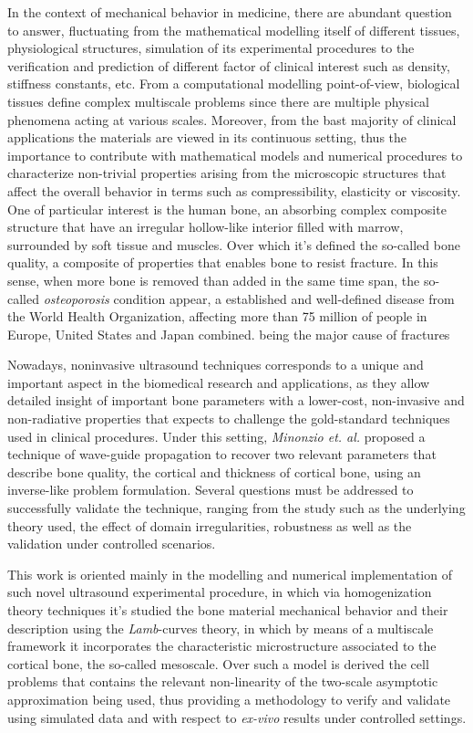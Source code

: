 \begin{intro}
In the context of mechanical behavior in medicine, there are abundant question to answer, fluctuating from the mathematical modelling itself of different tissues, physiological structures, simulation of its experimental procedures to the verification and prediction of different factor of clinical interest such as density, stiffness constants, etc. From a computational modelling point-of-view, biological tissues define complex multiscale problems since there are multiple physical phenomena acting at various scales. Moreover, from the bast majority of clinical applications the materials are viewed in its continuous setting, thus the importance to contribute with mathematical models and numerical procedures to characterize non-trivial properties arising from the microscopic structures that affect the overall behavior in terms such as compressibility, elasticity or viscosity.
One of particular interest is the human bone, an absorbing complex composite structure that have an irregular hollow-like interior filled with marrow, surrounded by soft tissue and muscles. Over which it's defined the so-called bone quality, a composite of properties that enables bone to resist fracture. In this sense, when more bone is removed than added in the same time span, the so-called \textit{osteoporosis} condition appear, a established and well-defined disease from the World Health Organization, affecting more than 75 million of people in Europe, United States and Japan combined. being the major cause of fractures

Nowadays, noninvasive ultrasound techniques corresponds to a unique and important aspect in the biomedical research and applications, as they allow detailed insight of important bone parameters with a lower-cost, non-invasive and non-radiative properties that expects to challenge the gold-standard techniques used in clinical procedures. Under this setting, \textit{Minonzio et. al.} \cite{Minonzio2018} proposed a technique of wave-guide propagation to recover two relevant parameters that describe bone quality, the cortical and thickness of cortical bone, using an inverse-like problem formulation. Several questions must be addressed to successfully validate the technique, ranging from the study such as the underlying theory used, the effect of domain irregularities, robustness as well as the validation under controlled scenarios.

This work is oriented mainly in the modelling and numerical implementation of such novel ultrasound experimental procedure, in which via homogenization theory techniques it's studied the bone material mechanical behavior and their description using the \textit{Lamb}-curves theory, in which by means of a multiscale framework it incorporates the characteristic microstructure associated to the cortical bone, the so-called mesoscale. 
Over such a model is derived the cell problems that contains the relevant non-linearity of the two-scale asymptotic approximation being used, thus providing a methodology to verify and validate using simulated data and with respect to \textit{ex-vivo} results under controlled settings.


\end{intro}
